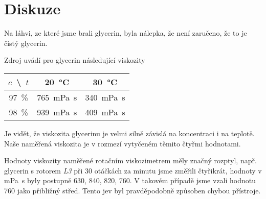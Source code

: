 \section*{Diskuze}
Na láhvi, ze které jsme brali glycerin, byla nálepka, že není zaručeno, že to je čistý glycerin.

Zdroj \cite{skripta} uvádí pro glycerin následující viskozity


\begin{tabular}[h]{ccc}
$c$~\textbackslash~$t$ & \SI{20}{\degreeCelsius} & \SI{30}{\degreeCelsius} \\ \hline
\SI{97}{\percent} & \SI{765}{\milli\pascal\s} & \SI{340}{\milli\pascal\s} \\
\SI{98}{\percent} & \SI{939}{\milli\pascal\s} & \SI{409}{\milli\pascal\s} \\
\end{tabular}

Je vidět, že viskozita glycerinu je velmi silně závislá na koncentraci i na teplotě.
Naše naměřená viskozita je v rozmezí vytyčeném těmito čtyřmi hodnotami.

Hodnoty viskozity naměřené rotačním viskozimetrem měly značný rozptyl, např. glycerin s rotorem \emph{L3} při \num{30} otáčkách za minutu jsme změřili čtyřikrát, hodnoty v \si{\milli\pascal\s} byly postupně 630, 840, 820, 760.
V takovém případě jsme vzali hodnotu 760 jako přibližný střed.
Tento jev byl pravděpodobně způsoben chybou přístroje.